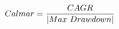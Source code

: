 \documentclass[preview]{standalone}
\begin{document}
\begin{align*}
\special{dvisvgm:raw <g id='unique000'>}Calmar = \frac{CAGR}{|Max\ Drawdown|}\special{dvisvgm:raw </g>}
\end{align*}
\end{document}
